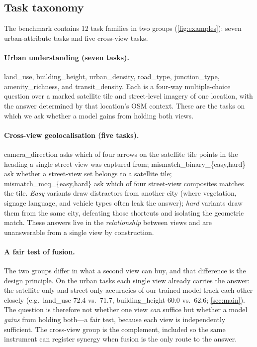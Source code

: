 \subsection{Task taxonomy}
\label{sec:taxonomy}
The benchmark contains \num{12} task families in two groups (\cref{fig:examples}):
seven urban-attribute tasks and five cross-view tasks.

\paragraph{Urban understanding (seven tasks).}
\textsf{land\_use}, \textsf{building\_height}, \textsf{urban\_density},
\textsf{road\_type}, \textsf{junction\_type}, \textsf{amenity\_richness}, and
\textsf{transit\_density}. Each is a four-way multiple-choice question over a marked
satellite tile and street-level imagery of one location, with the answer determined
by that location's OSM context. These are the tasks on which we ask whether a model
gains from holding both views.

\paragraph{Cross-view geolocalisation (five tasks).}
\textsf{camera\_direction} asks which of four arrows on the satellite tile points
in the heading a single street view was captured from;
\textsf{mismatch\_binary\_\{easy,hard\}} ask whether a street-view set belongs to a
satellite tile; \textsf{mismatch\_mcq\_\{easy,hard\}} ask which of four street-view
composites matches the tile. \emph{Easy} variants draw distractors from another
city (where vegetation, signage language, and vehicle types often leak the answer);
\emph{hard} variants draw them from the same city, defeating those shortcuts and
isolating the geometric match. These answers live in the \emph{relationship}
between views and are unanswerable from a single view by construction.

\paragraph{A fair test of fusion.}
The two groups differ in what a second view can buy, and that difference is the
design principle. On the urban tasks each single view already carries the answer:
the satellite-only and street-only accuracies of our trained model track each other
closely (e.g.\ \textsf{land\_use} \num{72.4} vs.\ \num{71.7},
\textsf{building\_height} \num{60.0} vs.\ \num{62.6}; \cref{sec:main}). The question
is therefore not whether one view \emph{can} suffice but whether a model \emph{gains}
from holding both---a fair test, because each view is independently sufficient. The
cross-view group is the complement, included so the same instrument can register
synergy when fusion is the only route to the answer.


